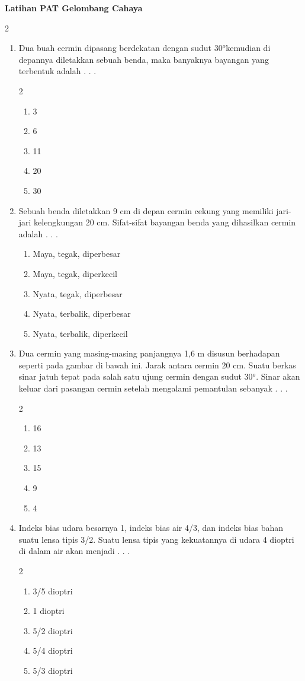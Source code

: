 \documentclass[10pt,a4paper]{extarticle}
\newcommand*\pilgan[1]{
\begin{enumerate}[label=\Alph*., itemsep=0pt,topsep=0pt,leftmargin=*,align=Center] #1 
\end{enumerate}}
\newcommand{\pilgani}[1]{                            \vspace{-0.3cm}\begin{multicols}{2}
 \begin{enumerate}[label=\Alph*., itemsep=0pt,topsep=0pt,leftmargin=*,align=Center]#1                     \end{enumerate}
 \phantom{ini cuma sapi, wedus, dan ayam}
 \end{multicols}}
\begin{document}
 \textbf{Latihan PAT Gelombang Cahaya} \phantom{ini nama siswa yang aaamengerjakan soal kuis ini }  

\begin{multicols*}{2}\raggedcolumns

\begin{enumerate}
\item Dua buah cermin dipasang berdekatan dengan sudut 30$^o$kemudian di depannya diletakkan sebuah benda, maka banyaknya bayangan yang terbentuk adalah . . .
\pilgani{
	\item 3
	\item 6
	\item 11
	\item 20
	\item 30
}
\vspace{2cm}

\item Sebuah benda diletakkan 9 cm di depan cermin cekung yang memiliki jari-jari kelengkungan 20 cm. Sifat-sifat bayangan benda yang dihasilkan cermin adalah . . . 
\pilgan{
	\item Maya, tegak, diperbesar
	\item Maya, tegak, diperkecil
	\item Nyata, tegak, diperbesar
	\item Nyata, terbalik, diperbesar
	\item Nyata, terbalik, diperkecil
}
\vspace{4.2cm}

\item Dua cermin yang masing-masing panjangnya 1,6 m disusun berhadapan seperti pada gambar di bawah ini. Jarak antara cermin 20 cm. Suatu berkas sinar jatuh tepat pada salah satu ujung cermin dengan sudut 30$^o$. Sinar akan keluar dari pasangan cermin setelah mengalami pemantulan sebanyak . . . 
\pilgani{
	\item 16
	\item 13
	\item 15
	\item 9
	\item 4
}
\vspace{4cm}

\item Indeks bias udara besarnya 1, indeks bias air 4/3, dan indeks bias bahan suatu lensa tipis 3/2. Suatu lensa tipis yang kekuatannya di udara 4 dioptri di dalam air akan menjadi . . . 
\pilgani{
	\item 3/5 dioptri
	\item 1 dioptri
	\item 5/2 dioptri
	\item 5/4 dioptri
	\item 5/3 dioptri
}
\vspace{4.2cm}


\end{enumerate}
\end{multicols*}
\end{document}
